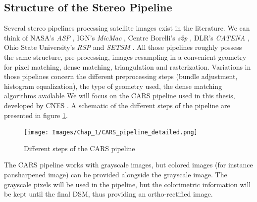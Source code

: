 \subsection{Structure of the Stereo Pipeline}
Several stereo pipelines processing satellite images exist in the literature. We can think of NASA's \textit{ASP} \cite{shean_automated_2016}, IGN's \textit{MicMac} \cite{rupnik_micmac_2017}, Centre Borelli's \textit{s2p} \cite{franchis_automatic_2014}, DLR's \textit{CATENA} \cite{kraus_fully_2013}, Ohio State University's \textit{RSP} and \textit{SETSM} \cite{qin_rpc_2016, noh_surface_2017}. All those pipelines roughly possess the same structure, \ie pre-processing, images resampling in a convenient geometry for pixel matching, dense matching, triangulation and rasterization. Variations in those pipelines concern the different preprocessing steps (bundle adjustment, histogram equalization), the type of geometry used, the dense matching algorithms available \etc{} We will focus on the CARS pipeline used in this thesis, developed by CNES \cite{michel_new_2020}. A schematic of the different steps of the pipeline are presented in figure \ref{fig:cars_pipeline}.
\begin{figure}
    \centering
    \texttt{[image: Images/Chap\_1/CARS\_pipeline\_detailed.png]}
    \caption{Different steps of the CARS pipeline}
    \label{fig:cars_pipeline}
\end{figure}
The CARS pipeline works with grayscale images, but colored images (for instance pansharpened image) can be provided alongside the grayscale image. The grayscale pixels will be used in the pipeline, but the colorimetric information will be kept until the final DSM, thus providing an ortho-rectified image.

